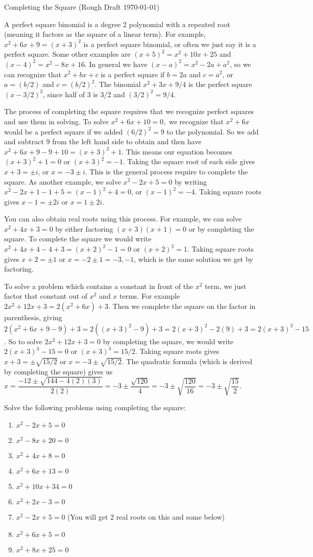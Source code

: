 \documentclass[10pt]{article}
\begin{document}
{\huge Completing the Square }
(Rough Draft \today)

A perfect square binomial is a degree 2 polynomial with a repeated root (meaning it factors as the square of a linear term).  For example, $x^2+6x+9 = (x+3)^2$ is a perfect square binomial, or often we just say it is a perfect square.  Some other examples are $(x+5)^2=x^2+10x+25$ and $(x-4)^2=x^2-8x+16$. In general we have $(x-a)^2 = x^2-2a+a^2$, so we can recognize that $x^2+bx+c$ is a perfect square if $b=2a$ and $c=a^2$, or $a=(b/2)$ and $c=(b/2)^2$. The binomial $x^2+3x+9/4$ is the perfect square $(x-3/2)^2$, since half of 3 is 3/2 and $(3/2)^2=9/4$. 

The process of completing the square requires that we recognize perfect squares and use them in solving.  To solve $x^2+6x+10=0,$ we recognize that $x^2+6x$ would be a perfect square if we added $(6/2)^2 = 9$ to the polynomial.  So we add and subtract 9 from the left hand side to obtain and then have $x^2+6x+9-9+10 = (x+3)^2+1$.  This means our equation becomes $(x+3)^2+1=0$ or $(x+3)^2=-1$. Taking the square root of each side gives $x+3=\pm i$, or $x=-3\pm i$.  This is the general process require to complete the square. As another example, we solve $x^2-2x+5=0$ by writing $x^2-2x+1-1+5=(x-1)^2+4=0$, or $(x-1)^2=-4$. Taking square roots gives $x-1=\pm 2i$ or $x=1\pm 2i$. 

You can also obtain real roots using this process. For example, we can solve $x^2+4x+3=0$ by either factoring $(x+3)(x+1)=0$ or by completing the square. To complete the square we would write $x^2+4x+4-4+3= (x+2)^2-1=0$ or $(x+2)^2=1$. Taking square roots gives $x+2=\pm 1$ or $x=-2\pm 1 = -3,-1$, which is the same solution we get by factoring.

To solve a problem which contains a constant in front of the $x^2$ term, we just factor that constant out of $x^2$ and $x$ terms.  For example $2x^2+12x+3 = 2(x^2+6x)+3$. Then we complete the square on the factor in parenthesis, giving $2(x^2+6x+9-9)+3 = 2((x+3)^2-9)+3 = 2(x+3)^2-2(9)+3 = 2(x+3)^3-15$. So to solve $2x^2+12x+3=0$ by completing the square, we would write $ 2(x+3)^3-15=0$ or $ (x+3)^3=15/2$. Taking square roots gives $x+3 = \pm \sqrt{15/2}$ or $x = -3\pm \sqrt {15/2}$.  The quadratic formula (which is derived by completing the square) gives us $x = \dfrac{-12\pm\sqrt{144-4(2)(3)}}{2(2)}=-3\pm\dfrac{\sqrt{120}}{4} = -3\pm\sqrt{\dfrac{120}{16}} = -3\pm\sqrt{\dfrac{15}{2}}$. 



Solve the following problems using completing the square:

\begin{enumerate}
	\item $x^2-2x+5=0$
	\item $x^2-8x+20=0$
	\item $x^2+4x+8=0$
	\item $x^2+6x+13=0$
	\item $x^2+10x+34=0$
	\item $x^2+2x-3=0$
	\item $x^2-2x+5=0$ (You will get 2 real roots on this and some below)
	\item $x^2+6x+5=0$
	\item $x^2+8x+25=0$
\end{enumerate}
\end{document}
